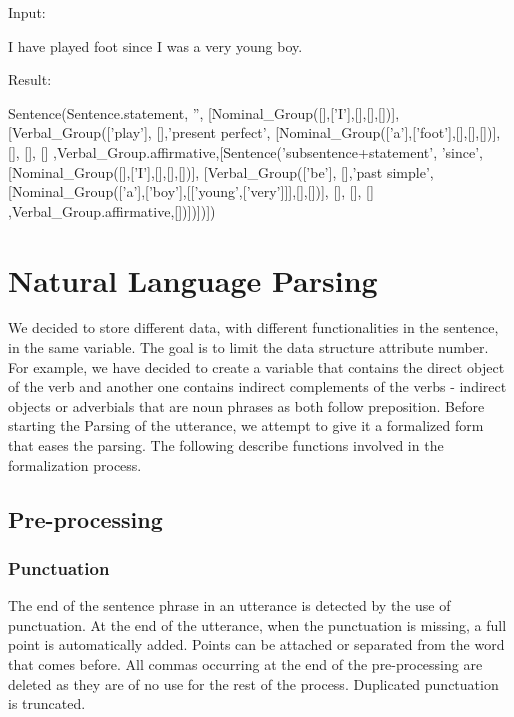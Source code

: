 \documentclass[twoside,a4paper,10pt]{report}
\begin{document}
Input:


\small
\begin{verbatimtab}
I have played foot since I was a very young boy.
\end{verbatimtab}
\normalsize
Result:


\small
\begin{verbatimtab}
  Sentence(Sentence.statement, '', 
      [Nominal_Group([],['I'],[],[],[])], 
      [Verbal_Group(['play'], [],'present perfect', 
          [Nominal_Group(['a'],['foot'],[],[],[])], 
          [],
          [], [] ,Verbal_Group.affirmative,[Sentence('subsentence+statement', 'since', 
              [Nominal_Group([],['I'],[],[],[])], 
              [Verbal_Group(['be'], [],'past simple', 
                  [Nominal_Group(['a'],['boy'],[['young',['very']]],[],[])], 
                  [],
                  [], [] ,Verbal_Group.affirmative,[])])])])
\end{verbatimtab}
\normalsize

\chapter{Natural Language Parsing}
\label{40b6d909561b858c733e07e5b7595576}%
We decided to store different data, with different functionalities in the sentence, in the same variable. The goal is to limit the data structure attribute number.
For example, we have decided to create a variable that contains the direct object of the verb and another one contains indirect complements of the verbs - indirect objects or adverbials that are noun phrases as both follow preposition.
Before starting the Parsing of the utterance, we attempt to give it a formalized form that eases the parsing. The following describe functions involved in the formalization process.


\section{Pre-processing}
\label{786dd9bb7bc5625a566d42a2962bebf7}%

\subsection{Punctuation}
\label{9ac6d441030eb0844ffb83ba4f100c94}%
The end of the sentence phrase in an utterance is detected by the use of punctuation. At the end of the utterance, when the punctuation is missing, a full point is automatically added. Points can be attached or separated from the word that comes before.
All commas occurring at the end of the pre-processing are deleted as they are of no use for the rest of the process.
Duplicated punctuation is truncated.
\end{document}
